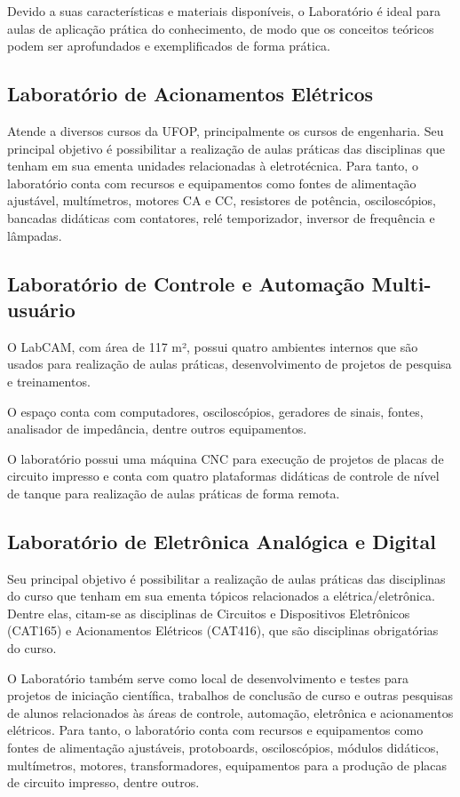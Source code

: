 \documentclass[
	12pt,				%
	openright,			%
	oneside,			%
	a4paper,			%
	english,			%
	brazil				%
	]{abntex2}
\begin{document}
Devido a suas características e materiais disponíveis, o Laboratório é ideal para aulas de aplicação prática do conhecimento, de modo que os conceitos teóricos podem ser aprofundados e exemplificados de forma prática.

\subsection*{Laboratório de Acionamentos Elétricos}

Atende a diversos cursos da UFOP, principalmente os cursos de engenharia. Seu principal objetivo é possibilitar a realização de aulas práticas das disciplinas que tenham em sua ementa unidades relacionadas à eletrotécnica. Para tanto, o laboratório conta com recursos e equipamentos como fontes de alimentação ajustável, multímetros, motores CA e CC, resistores de potência, osciloscópios, bancadas didáticas com contatores, relé temporizador, inversor de frequência e lâmpadas.

\subsection*{Laboratório de Controle e Automação Multi-usuário}

O LabCAM, com área de 117 m², possui quatro ambientes internos que são usados para realização de aulas práticas, desenvolvimento de projetos de pesquisa e treinamentos.

O espaço conta com computadores, osciloscópios, geradores de sinais, fontes, analisador de impedância, dentre outros equipamentos.

O laboratório possui uma máquina CNC para execução de projetos de placas de circuito impresso e conta com quatro plataformas didáticas de controle de nível de tanque para realização de aulas práticas de forma remota.

\subsection*{Laboratório de Eletrônica Analógica e Digital}

Seu principal objetivo é possibilitar a realização de aulas práticas das disciplinas do curso que tenham em sua ementa tópicos relacionados a elétrica/eletrônica. Dentre elas, citam-se as disciplinas de Circuitos e Dispositivos Eletrônicos (CAT165) e Acionamentos Elétricos (CAT416), que são disciplinas obrigatórias do curso.

O Laboratório também serve como local de desenvolvimento e testes para projetos de iniciação científica, trabalhos de conclusão de curso e outras pesquisas de alunos relacionados às áreas de controle, automação, eletrônica e acionamentos elétricos. Para tanto, o laboratório conta com recursos e equipamentos como fontes de alimentação ajustáveis, protoboards, osciloscópios, módulos didáticos, multímetros, motores, transformadores, equipamentos para a produção de placas de circuito impresso, dentre outros.
\end{document}
